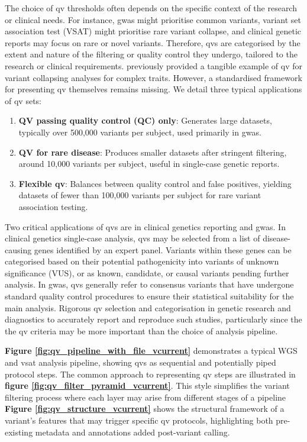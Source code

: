 The choice of \ac{qv} thresholds often depends on the specific context of the research or clinical needs. 
For instance, \ac{gwas} might prioritise common variants, 
variant set association test (VSAT) might prioritise rare variant collapse, 
and clinical genetic reports may focus on rare or novel variants. 
Therefore, \ac{qv}s are categorised by the extent and nature of the filtering or quality control they undergo, tailored to the research or clinical requirements. 
\citet{povysil2019rare} previously provided a tangible example of \ac{qv} for variant collapsing analyses for complex traits. 
However, a standardised framework for presenting \ac{qv} themselves remains missing. 
We detail three typical applications of \ac{qv} sets:

\begin{enumerate}
    \item \textbf{QV passing quality control (QC) only}: Generates large datasets, typically over 500,000 variants per subject, used primarily in \ac{gwas}.
    \item \textbf{QV for rare disease}: Produces smaller datasets after stringent filtering, around 10,000 variants per subject, useful in single-case genetic reports.
    \item \textbf{Flexible \ac{qv}}: Balances between quality control and false positives, yielding datasets of fewer than 100,000 variants per subject for rare variant association testing.
\end{enumerate}

Two critical applications of  \ac{qv}s are in clinical genetics reporting and \ac{gwas}. 
In clinical genetics single-case analysis, \ac{qv}s may be selected from a list of disease-causing genes identified by an expert panel. 
Variants within these genes can be categorised based on their potential pathogenicity into variants of unknown significance (VUS), or as known, candidate, or causal variants pending further analysis. 
In \ac{gwas}, \ac{qv}s generally refer to consensus variants that have undergone standard quality control procedures to ensure their statistical suitability for the main analysis.
Rigorous \ac{qv} selection and categorisation in genetic research and diagnostics to accurately report and reproduce such studies, particularly since the the \ac{qv} criteria may be more important than the choice of analysis pipeline. 

\textbf{Figure \ref{fig:qv_pipeline_with_file_vcurrent}} 
demonstrates a typical WGS and \ac{vsat} analysis pipeline, showing \ac{qv}s as sequential and potentially piped protocol steps.
The common approach to representing \ac{qv} steps are illustrated in 
\textbf{figure \ref{fig:qv_filter_pyramid_vcurrent}}.
This style simplifies the variant filtering process where each layer may arise from different stages of a pipeline
 \textbf{Figure 
\ref{fig:qv_structure_vcurrent}}
shows the structural framework of a variant's features that may trigger specific \ac{qv} protocols, highlighting both pre-existing metadata and annotations added post-variant calling.

